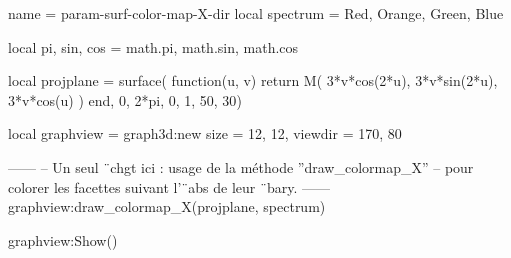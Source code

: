 \documentclass{standalone}
\begin{document}
\begin{luadraw}{name = param-surf-color-map-X-dir}
local spectrum = {Red, Orange, Green, Blue}

local pi, sin, cos = math.pi, math.sin, math.cos

local projplane = surface(
  function(u, v)
    return M(
      3*v*cos(2*u),
      3*v*sin(2*u),
      3*v*cos(u)
    )
  end,
  0, 2*pi, 0, 1,
  {50, 30})

local graphview = graph3d:new{
  size    = {12, 12},
  viewdir = {170, 80}
}

------
-- Un seul ¨chgt ici : usage de la méthode ''draw_colormap_X''
-- pour colorer les facettes suivant l'¨abs de leur ¨bary.
------
graphview:draw_colormap_X(projplane, spectrum)

graphview:Show()
\end{luadraw}
\end{document}
